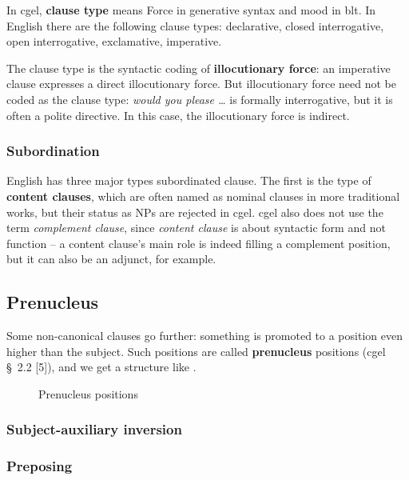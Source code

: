 \documentclass{article}
\newcommand*{\citesec}[1]{\S~{#1}}
\newcommand*{\concept}[1]{\textbf{#1}}
\newcommand*{\term}[1]{\emph{#1}}
\newcommand*{\corpus}[1]{\emph{#1}}
\begin{document}
In \ac{cgel}, \concept{clause type} means Force in generative syntax and mood in \ac{blt}.
In English there are the following clause types:
declarative, closed interrogative, open interrogative, exclamative, imperative.

The clause type is the syntactic coding of \concept{illocutionary force}:
an imperative clause expresses a direct illocutionary force.
But illocutionary force need not be coded as the clause type:
\corpus{would you please \dots} is formally interrogative, 
but it is often a polite directive.
In this case, the illocutionary force is indirect.

\subsubsection{Subordination}

English has three major types subordinated clause.
The first is the type of \concept{content clauses}, 
which are often named as nominal clauses in more traditional works,
but their status as NPs are rejected in \ac{cgel}. %
\ac{cgel} also does not use the term \term{complement clause},
since \term{content clause} is about syntactic form and not function -- 
a content clause's main role is indeed filling a complement position,
but it can also be an adjunct, for example.


\subsection{Prenucleus}\label{sec:prenucleus}

Some non-canonical clauses go further: something is promoted to a position even higher than the subject.
Such positions are called \concept{prenucleus} positions (\ac{cgel} \citesec{2.2} [5]), 
and we get a structure like .

\begin{figure}
    \centering
    
    \caption{Prenucleus positions}
    \label{fig:prenucleus}
\end{figure}

\subsubsection{Subject-auxiliary inversion}

\subsubsection{Preposing}
\end{document}
